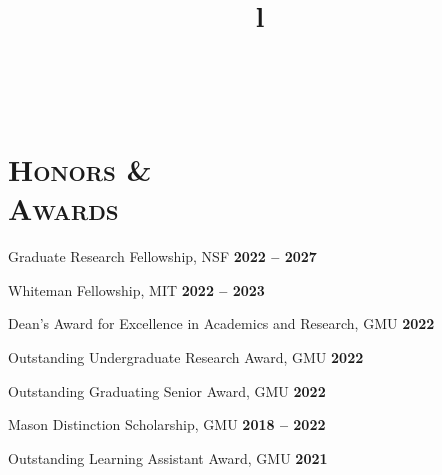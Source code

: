 \documentclass[marg, centered]{res}
\begin{document}
\begin{resume}

\begin{format}
\title{l} \\
\body
\end{format}


\section{{\scshape \bfseries Honors \&\\ Awards}}

{Graduate Research Fellowship, NSF \hfill \textbf{2022 -- 2027}}
\vspace{-0.4cm}

{Whiteman Fellowship, MIT \hfill \textbf{2022 -- 2023}}
\vspace{-0.4cm}

{Dean's Award for Excellence in Academics and Research, GMU \hfill \textbf{2022}}
\vspace{-0.4cm}

{Outstanding Undergraduate Research Award, GMU \hfill \textbf{2022}}
\vspace{-0.4cm}

{Outstanding Graduating Senior Award, GMU \hfill \textbf{2022}}
\vspace{-0.4cm}

{Mason Distinction Scholarship, GMU \hfill \textbf{2018 -- 2022}}
\vspace{-0.4cm}

{Outstanding Learning Assistant Award, GMU \hfill \textbf{2021}}
\vspace{-0.4cm}


\end{resume}
\end{document}
